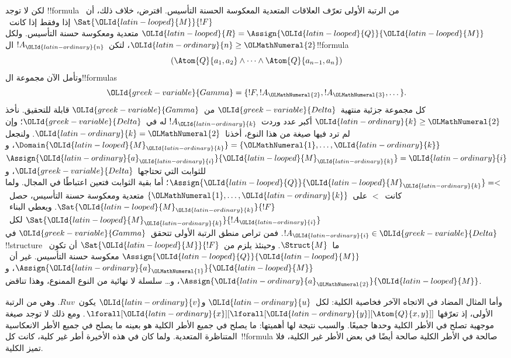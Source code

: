\documentclass[../../../include/open-logic-section]{subfiles}
\begin{document}
لكن لا توجد !!{formula} من الرتبة الأولى تعرّف العلاقات المتعدية
المعكوسة الحسنة التأسيس. افترض، خلاف ذلك، أن~$\Sat{\OLId{latin-looped}{M}}{!F}$ إذا وفقط
إذا كانت~$\OLId{latin-looped}{R} = \Assign{\OLId{latin-looped}{Q}}{\OLId{latin-looped}{M}}$ متعدية ومعكوسة حسنة التأسيس. ولكل
$\OLId{latin-ordinary}{n} \ge \OLMathNumeral{2}$، لتكن~$!A_\OLId{latin-ordinary}{n}$ ال!!{formula}
\[
(\Atom{Q}{a_1,a_2} \land \dots \land
    \Atom{Q}{a_{n-1},a_{n}})
\]
وتأمل الآن مجموعة ال!!{formula}s
\[
\OLId{greek-variable}{Gamma} = \{!F, !A_\OLMathNumeral{2}, !A_\OLMathNumeral{3}, \dots\}.
\]
كل مجموعة جزئية منتهية~$\OLId{greek-variable}{Delta}$ من~$\OLId{greek-variable}{Gamma}$ قابلة للتحقيق. نأخذ
$\OLId{latin-ordinary}{k} \ge \OLMathNumeral{2}$ أكبر عدد وردت~$!A_\OLId{latin-ordinary}{k}$ له في~$\OLId{greek-variable}{Delta}$؛ وإن لم ترد فيها
صيغة من هذا النوع، أخذنا~$\OLId{latin-ordinary}{k}=\OLMathNumeral{2}$. ولنجعل
$\Domain{\OLId{latin-looped}{M}_\OLId{latin-ordinary}{k}} = \{\OLMathNumeral{1}, \dots, \OLId{latin-ordinary}{k}\}$، و$\Assign{\OLId{latin-ordinary}{a}_\OLId{latin-ordinary}{i}}{\OLId{latin-looped}{M}_\OLId{latin-ordinary}{k}} = \OLId{latin-ordinary}{i}$
للثوابت التي تحتاجها~$\OLId{greek-variable}{Delta}$، و$\Assign{\OLId{latin-looped}{Q}}{\OLId{latin-looped}{M}_\OLId{latin-ordinary}{k}} = <$؛
أما بقية الثوابت فتعين اعتباطًا في المجال.
ولما كانت~$<$ على~$\{\OLMathNumeral{1}, \dots, \OLId{latin-ordinary}{k}\}$ متعدية ومعكوسة حسنة التأسيس،
حصل~$\Sat{\OLId{latin-looped}{M}_\OLId{latin-ordinary}{k}}{!F}$. ويعطي البناء~$\Sat{\OLId{latin-looped}{M}_\OLId{latin-ordinary}{k}}{!A_\OLId{latin-ordinary}{i}}$
لكل~$!A_\OLId{latin-ordinary}{i} \in \OLId{greek-variable}{Delta}$. فمن تراص منطق الرتبة الأولى تتحقق~$\OLId{greek-variable}{Gamma}$
في !!{structure} ما~$\Struct{M}$. وحينئذ يلزم من~$\Sat{\OLId{latin-looped}{M}}{!F}$
أن تكون~$\Assign{\OLId{latin-looped}{Q}}{\OLId{latin-looped}{M}}$ معكوسة حسنة التأسيس.
غير أن~$\Assign{\OLId{latin-ordinary}{a}_\OLMathNumeral{1}}{\OLId{latin-looped}{M}}$، و$\Assign{\OLId{latin-ordinary}{a}_\OLMathNumeral{2}}{\OLId{latin-looped}{M}}$، و\dots{}
سلسلة لا نهائية من النوع الممنوع، وهذا تناقض.

وأما المثال المضاد في الاتجاه الآخر فخاصية الكلية: لكل~$\OLId{latin-ordinary}{u}$ و$\OLId{latin-ordinary}{v}$
يكون~$Ruv$. وهي من الرتبة الأولى، إذ تعرّفها
$\lforall[\OLId{latin-ordinary}{x}][\lforall[\OLId{latin-ordinary}{y}][\Atom{Q}{x,y}]]$. ومع ذلك لا توجد صيغة
موجهية تصلح في الأطر الكلية وحدها جميعًا. والسبب نتيجة لها
أهميتها: ما يصلح في جميع الأطر الكلية هو بعينه ما يصلح في جميع
الأطر الانعكاسية المتناظرة المتعدية. ولما كان في هذه الأخيرة أطر
غير كلية، كانت كل~!!{formula} صالحة في الأطر الكلية صالحة أيضًا
في بعض الأطر غير الكلية، فلا تميز الكلية.
\end{document}
